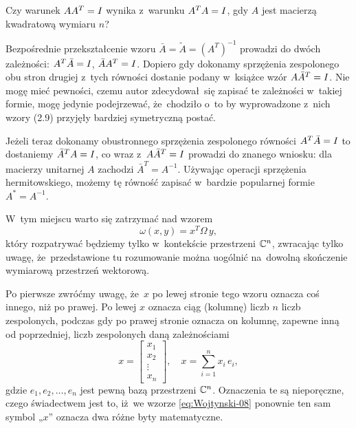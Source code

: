 \documentclass[a4paper,11pt]{article}
\begin{document}
\start {} Czy warunek $A A^{ T } = I$ wynika z~warunku
$A^{ T } A = I$, gdy $A$ jest macierzą kwadratową wymiaru $n$?

\vspace{\spaceFour}





\start {} Bezpośrednie przekształcenie wzoru
$\bar{A} = \widetilde{A} = ( A^{ T } )^{ -1 }$ prowadzi do dwóch zależności:
$A^{ T } \bar{A} = I$, $\bar{A} A^{ T } = I$. Dopiero gdy
dokonamy sprzężenia zespolonego obu stron drugiej z~tych równości dostanie
podany w~książce wzór $A \bar{A}^{ T } = I$. Nie mogę mieć pewności,
czemu autor zdecydował~się zapisać te zależności w~takiej formie, mogę
jedynie podejrzewać, że~chodziło o~to by wyprowadzone z~nich wzory (2.9)
przyjęły bardziej symetryczną postać.

Jeżeli teraz dokonamy obustronnego sprzężenia zespolonego równości
$A^{ T } \bar{A} = I$ to dostaniemy $\bar{A}^{ T } A = I$, co
wraz z~$A \bar{A}^{ T } = I$ prowadzi do znanego wniosku: dla
macierzy unitarnej $A$ zachodzi $\bar{A}^{ T } = A^{ -1 }$. Używając
operacji sprzężenia hermitowskiego, możemy tę równość zapisać w~bardzie
popularnej formie $A^{ * } = A^{ -1 }$.

\vspace{\spaceFour}





\start {} W~tym miejscu warto się zatrzymać nad wzorem
\begin{equation}
  \label{eq:Wojtynski-07}
  \omega( x, y ) = x^{ T } \Omega \, y,
\end{equation}
który rozpatrywać będziemy tylko w~kontekście przestrzeni $\mathbb{C}^{ n }$,
zwracając tylko uwagę, że~przedstawione tu rozumowanie można uogólnić
na~dowolną skończenie wymiarową przestrzeń wektorową.

Po pierwsze zwróćmy uwagę, że~$x$ po lewej stronie tego wzoru oznacza coś
innego, niż po prawej. Po lewej $x$ oznacza ciąg (kolumnę) liczb $n$ liczb
zespolonych, podczas gdy po prawej stronie oznacza on kolumnę, zapewne inną
od poprzedniej, liczb zespolonych daną zależnościami
\begin{equation}
  \label{eq:Wojtynski-08}
  x =
  \begin{bmatrix}
    x_{ 1 } \\
    x_{ 2 } \\
    \vdots \\
    x_{ n }
  \end{bmatrix}, \quad
  x = \sum_{ i = 1 }^{ n } x_{ i } \, e_{ i },
\end{equation}
gdzie $e_{ 1 }, e_{ 2 }, \ldots, e_{ n }$ jest pewną bazą przestrzeni $\mathbb{C}^{ n }$.
Oznaczenia te są nieporęczne, czego świadectwem jest to, iż~we wzorze
\eqref{eq:Wojtynski-08} ponownie ten sam symbol „$x$” oznacza dwa różne
byty matematyczne.
\end{document}
